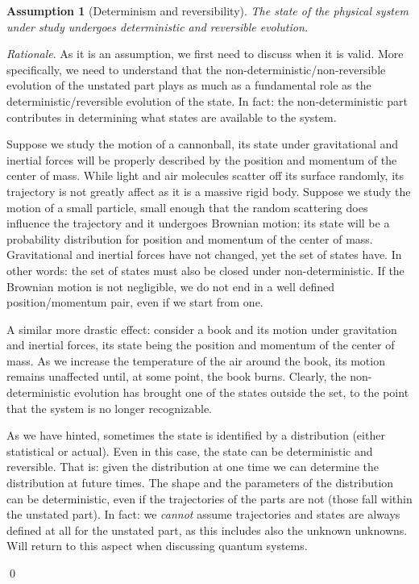 \documentclass[aps,pra,10pt,twocolumn,floatfix,nofootinbib]{revtex4-1}
\newtheorem{assump}{Assumption}
\theoremstyle{definition}
\newenvironment{rationale}{\emph{Rationale}.}{\qed}
\begin{document}
\begin{assump}[Determinism and reversibility]\label{detrevass}
The state of the physical system under study undergoes deterministic and reversible evolution.
\end{assump}

\begin{rationale}
As it is an assumption, we first need to discuss when it is valid. More specifically, we need to understand that the non-deterministic/non-reversible evolution of the unstated part plays as much as a fundamental role as the deterministic/reversible evolution of the state. In fact: the non-deterministic part contributes in determining what states are available to the system.

Suppose we study the motion of a cannonball, its state under gravitational and inertial forces will be properly described by the position and momentum of the center of mass. While light and air molecules scatter off its surface randomly, its trajectory is not greatly affect as it is a massive rigid body. Suppose we study the motion of a small particle, small enough that the random scattering does influence the trajectory and it undergoes Brownian motion: its state will be a probability distribution for position and momentum of the center of mass. Gravitational and inertial forces have not changed, yet the set of states have. In other words: the set of states must also be closed under non-deterministic. If the Brownian motion is not negligible, we do not end in a well defined position/momentum pair, even if we start from one. %

A similar more drastic effect: consider a book and its motion under gravitation and inertial forces, its state being the position and momentum of the center of mass. As we increase the temperature of the air around the book, its motion remains unaffected until, at some point, the book burns. Clearly, the non-deterministic evolution has brought one of the states outside the set, to the point that the system is no longer recognizable.

As we have hinted, sometimes the state is identified by a distribution (either statistical or actual). Even in this case, the state can be deterministic and reversible. That is: given the distribution at one time we can determine the distribution at future times. The shape and the parameters of the distribution can be deterministic, even if the trajectories of the parts are not (those fall within the unstated part). In fact: we \emph{cannot} assume trajectories and states are always defined at all for the unstated part, as this includes also the unknown unknowns. Will return to this aspect when discussing quantum systems.


\end{rationale}
\end{document}
